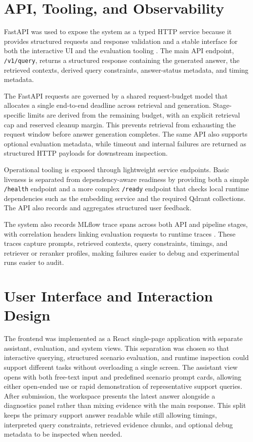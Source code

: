 \section{API, Tooling, and Observability}
\label{sec:api-tooling-observability}

FastAPI was used to expose the system as a typed HTTP service because it provides structured requests and response validation and a stable interface for both the interactive UI and the evaluation tooling \citep{FastAPI}. The main API endpoint, \texttt{/v1/query}, returns a structured response containing the generated answer, the retrieved contexts, derived query constraints, answer-status metadata, and timing metadata. 

The FastAPI requests are governed by a shared request-budget model that allocates a single end-to-end deadline across retrieval and generation. Stage-specific limits are derived from the remaining budget, with an explicit retrieval cap and reserved cleanup margin. This prevents retrieval from exhausting the request window before answer generation completes. The same API also supports optional evaluation metadata, while timeout and internal failures are returned as structured HTTP payloads for downstream inspection. 

Operational tooling is exposed through lightweight service endpoints. Basic liveness is separated from dependency-aware readiness by providing both a simple \texttt{/health} endpoint and a more complex \texttt{/ready} endpoint that checks local runtime dependencies such as the embedding service and the required Qdrant collections. The API also records and aggregates structured user feedback. 

The system also records MLflow trace spans across both API and pipeline stages, with correlation headers linking evaluation requests to runtime traces \citep{MLflowOpenSource}. These traces capture prompts, retrieved contexts, query constraints, timings, and retriever or reranker profiles, making failures easier to debug and experimental runs easier to audit. 

\section{User Interface and Interaction Design}
\label{sec:user-interface-interaction-design}

The frontend was implemented as a React single-page application with separate assistant, evaluation, and system views. This separation was chosen so that interactive querying, structured scenario evaluation, and runtime inspection could support different tasks without overloading a single screen. The assistant view opens with both free-text input and predefined scenario prompt cards, allowing either open-ended use or rapid demonstration of representative support queries. After submission, the workspace presents the latest answer alongside a diagnostics panel rather than mixing evidence with the main response. This split keeps the primary support answer readable while still allowing timings, interpreted query constraints, retrieved evidence chunks, and optional debug metadata to be inspected when needed. 

